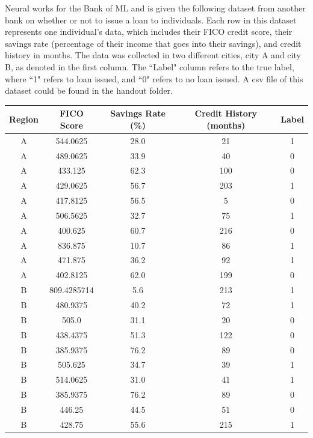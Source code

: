 \documentclass[11pt,addpoints,answers]{exam}
\begin{document}
\begin{questions}
Neural works for the Bank of ML and is given the following dataset from another bank on whether or not to issue a loan to individuals. Each row in this dataset represents one individual's data, which includes their FICO credit score, their savings rate (percentage of their income that goes into their savings), and credit history in months. The data was collected in two different cities, city A and city B, as denoted in the first column. The ``Label" column refers to the true label, where ``1" refers to loan issued, and ``0" refers to no loan issued. A csv file of this dataset could be found in the handout folder.\\
\begin{table}[htbp]
    \centering
    \label{tab:data}
    \begin{tabular}{|c|c|c|c|c|}
        \toprule
        Region & FICO Score & Savings Rate (\%) & Credit History (months) & Label \\
        \midrule
        A & 544.0625 & 28.0 & 21 & 1 \\
        A & 489.0625 & 33.9 & 40 & 0 \\
        A & 433.125 & 62.3 & 100 & 0 \\
        A & 429.0625 & 56.7 & 203 & 1 \\
        A & 417.8125 & 56.5 & 5 & 0 \\
        A & 506.5625 & 32.7 & 75 & 1 \\
        A & 400.625 & 60.7 & 216 & 0 \\
        A & 836.875 & 10.7 & 86 & 1 \\
        A & 471.875 & 36.2 & 92 & 1 \\
        A & 402.8125 & 62.0 & 199 & 0 \\
        \midrule
        B & 809.4285714 & 5.6 & 213 & 1 \\
        B & 480.9375 & 40.2 & 72 & 1 \\
        B & 505.0 & 31.1 & 20 & 0 \\
        B & 438.4375 & 51.3 & 122 & 0 \\
        B & 385.9375 & 76.2 & 89 & 0 \\
        B & 505.625 & 34.7 & 39 & 1 \\
        B & 514.0625 & 31.0 & 41 & 1 \\
        B & 385.9375 & 76.2 & 89 & 0 \\
        B & 446.25 & 44.5 & 51 & 0 \\
        B & 428.75 & 55.6 & 215 & 1 \\
        \bottomrule
    \end{tabular}
\end{table}


\end{questions}
\end{document}
